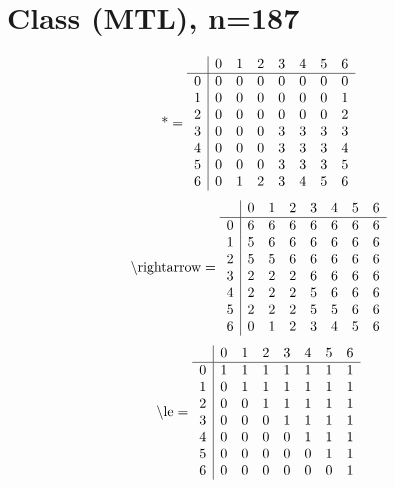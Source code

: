 \documentclass[11pt]{article}
\begin{document}
\section{Class (MTL), n=187}
\[\text{*} = 
\begin{array}{r | r r r r r r r}
 & 0 & 1 & 2 & 3 & 4 & 5 & 6 \\ \hline
0 & 0 & 0 & 0 & 0 & 0 & 0 & 0 \\
1 & 0 & 0 & 0 & 0 & 0 & 0 & 1 \\
2 & 0 & 0 & 0 & 0 & 0 & 0 & 2 \\
3 & 0 & 0 & 0 & 3 & 3 & 3 & 3 \\
4 & 0 & 0 & 0 & 3 & 3 & 3 & 4 \\
5 & 0 & 0 & 0 & 3 & 3 & 3 & 5 \\
6 & 0 & 1 & 2 & 3 & 4 & 5 & 6 \\
\end{array}
\]
\[\text{\textbackslash rightarrow} = 
\begin{array}{r | r r r r r r r}
 & 0 & 1 & 2 & 3 & 4 & 5 & 6 \\ \hline
0 & 6 & 6 & 6 & 6 & 6 & 6 & 6 \\
1 & 5 & 6 & 6 & 6 & 6 & 6 & 6 \\
2 & 5 & 5 & 6 & 6 & 6 & 6 & 6 \\
3 & 2 & 2 & 2 & 6 & 6 & 6 & 6 \\
4 & 2 & 2 & 2 & 5 & 6 & 6 & 6 \\
5 & 2 & 2 & 2 & 5 & 5 & 6 & 6 \\
6 & 0 & 1 & 2 & 3 & 4 & 5 & 6 \\
\end{array}
\]
\[\text{\textbackslash le} = 
\begin{array}{r | r r r r r r r}
 & 0 & 1 & 2 & 3 & 4 & 5 & 6 \\ \hline
0 & 1 & 1 & 1 & 1 & 1 & 1 & 1 \\
1 & 0 & 1 & 1 & 1 & 1 & 1 & 1 \\
2 & 0 & 0 & 1 & 1 & 1 & 1 & 1 \\
3 & 0 & 0 & 0 & 1 & 1 & 1 & 1 \\
4 & 0 & 0 & 0 & 0 & 1 & 1 & 1 \\
5 & 0 & 0 & 0 & 0 & 0 & 1 & 1 \\
6 & 0 & 0 & 0 & 0 & 0 & 0 & 1 \\
\end{array}
\]
\end{document}
